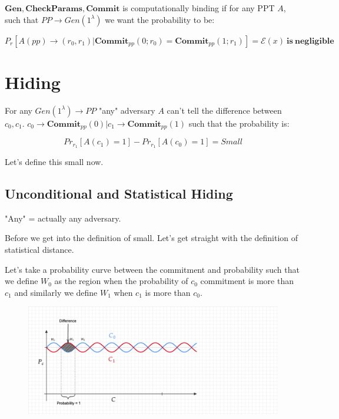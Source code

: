 \documentclass{article}
\begin{document}
$\mathbf{Gen}, \mathbf{CheckParams}, \mathbf{Commit}$ is computationally binding if for any PPT $A$, such that $PP \rightarrow Gen(1^\lambda)$ we want the probability to be:

$$
P_r[A(pp) \rightarrow (r_0, r_1) | \mathbf{Commit}_{pp}(0;r_0) = \mathbf{Commit}_{pp}(1;r_1)] = \mathcal{E}(x)\mathbf{\: is \: negligible}
$$

\section{Hiding}

For any $Gen(1^\lambda) \rightarrow PP$ "any" adversary $A$ can't tell the difference between $c_0, c_1$. $c_0 \rightarrow \mathbf{Commit}_{pp}(0) | c_1 \rightarrow \mathbf{Commit}_{pp}(1)$ such that the probability is:

$$
Pr_{r_1} [A(c_1) = 1] - Pr_{r_1} [A(c_0) = 1] = Small
$$

Let's define this small now.

\subsection{Unconditional and Statistical Hiding}

"Any" = actually any adversary.

Before we get into the definition of small. Let's get straight with the definition of statistical distance.

Let's take a probability curve between the commitment and probability such that we define $W_0$ as the region when the probability of $c_0$ commitment is more than $c_1$ and similarly we define $W_1$ when $c_1$ is more than $c_0$.

\begin{figure}[h]
    \centering
    \includegraphics[scale=0.25]{assets/week1-statistical-distance.png}
\end{figure}
\end{document}
